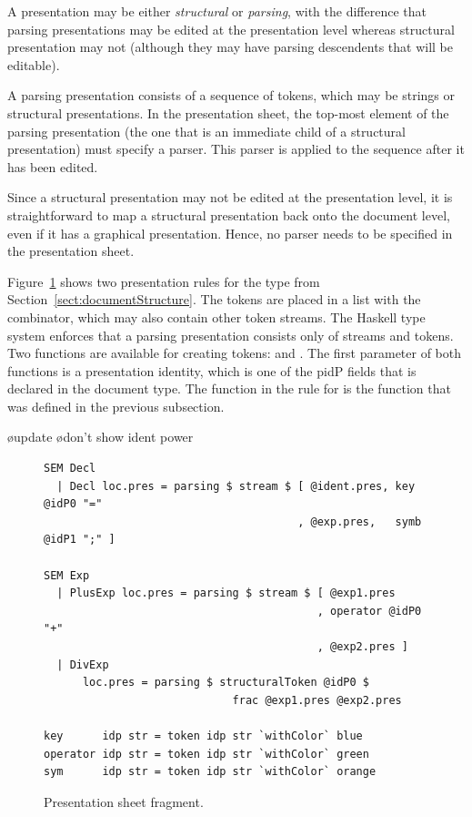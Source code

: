 \documentclass[12pt]{article}
\begin{document}

A presentation may be either {\em structural} or {\em parsing}, with the difference that parsing presentations may be edited at the presentation level whereas structural presentation may not (although they may have parsing descendents that will be editable). 

A parsing presentation consists of a sequence of tokens, which may be strings or structural presentations. In the presentation sheet, the top-most element of the parsing presentation (the one that is an immediate child of a structural presentation) must specify a parser. This parser is applied to the sequence after it has been edited.

Since a structural presentation may not be edited at the presentation level, it is straightforward to map a structural presentation back onto the document level, even if it has a graphical presentation. Hence, no parser needs to be specified in the presentation sheet.

Figure~\ref{fig:presentationSheet} shows two presentation rules for the type  from Section~\ref{sect:documentStructure}. The tokens are placed in a list with the  combinator, which may also contain other token streams. The Haskell type system enforces that a parsing presentation consists only of streams and tokens. Two functions are available for creating tokens:  and . The first parameter of both functions is a presentation identity, which is one of the p{idP} fields that is declared in the document type. The function  in the rule for  is the function that was defined in the previous subsection.

\bl
\o update
\o don't show ident power
\el

\begin{figure}
\begin{center}
\begin{footnotesize}
\begin{verbatim}
SEM Decl
  | Decl loc.pres = parsing $ stream $ [ @ident.pres, key @idP0 "="
                                       , @exp.pres,   symb @idP1 ";" ]

SEM Exp
  | PlusExp loc.pres = parsing $ stream $ [ @exp1.pres
                                          , operator @idP0 "+"
                                          , @exp2.pres ]
  | DivExp
      loc.pres = parsing $ structuralToken @idP0 $ 
                             frac @exp1.pres @exp2.pres
                  
key      idp str = token idp str `withColor` blue
operator idp str = token idp str `withColor` green
sym      idp str = token idp str `withColor` orange
\end{verbatim}
\end{footnotesize}
\caption{Presentation sheet fragment.} \label{fig:presentationSheet} 
\end{center}
\end{figure}
\end{document}
